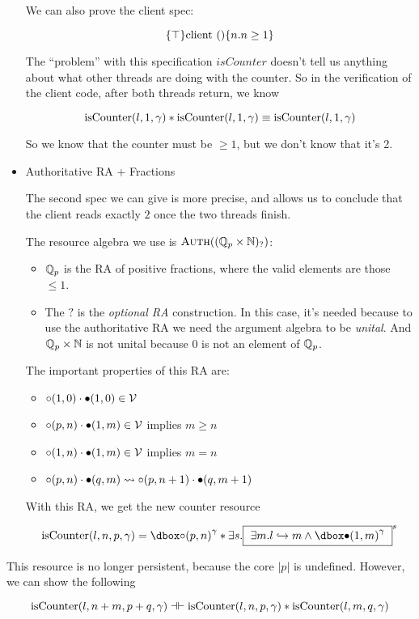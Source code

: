 \begin{itemize}
We can also prove the client spec:

\[ \{\top\} \text{client} \text{ } () \{n. n \ge 1\} \]

The ``problem'' with this specification $isCounter$ doesn't tell us anything about what other threads are doing with the counter. So in the verification of the client code, after both threads return, we know 

\[ \text{isCounter}(l, 1, \gamma)  * \text{isCounter}(l, 1, \gamma) \equiv \text{isCounter}(l, 1, \gamma) \]

So we know that the counter must be $\ge 1$, but we don't know that it's 2.

\item Authoritative RA + Fractions

The second spec we can give is more precise, and allows us to conclude that the client reads exactly $2$ once the two threads finish.

The resource algebra we use is $\textsc{Auth}((\mathbb{Q}_p \times \mathbb{N})_{?})$:
\begin{itemize}
\item $\mathbb{Q}_p$ is the RA of positive fractions, where the valid elements are those $\le 1$.
\item The $?$ is the \emph{optional RA} construction. In this case, it's needed because to use the authoritative RA we need the argument algebra to be \emph{unital}. And $\mathbb{Q}_p \times \mathbb{N}$ is not unital because $0$ is not an element of $\mathbb{Q}_p$.
\end{itemize}

The important properties of this RA are:
\begin{itemize}
\item $\circ (1, 0) \cdot \bullet (1, 0) \in \mathcal{V}$
\item $\circ (p, n) \cdot \bullet (1, m) \in \mathcal{V}$ implies $m \ge n$
\item $\circ (1, n) \cdot \bullet (1, m) \in \mathcal{V}$ implies $m = n$
\item $\circ (p, n) \cdot \bullet (q, m) \rightsquigarrow \circ (p, n + 1) \cdot \bullet (q, m + 1)$
\end{itemize}

With this RA, we get the new counter resource

\[ \isCounterF{l}{n}{p}{\gamma} = \ownr{\naelem{(p, n)}} {\gamma} * \exists s.\inv{ $\exists m. \pointsto{l}{m} \land \ownr{\aelem{(1, m)}}{\gamma} $ }{s} \]

\end{itemize}

This resource is no longer persistent, because the core $|p|$ is undefined. However, we can show the following

\[ \text{isCounter}(l, n + m, p + q, \gamma) \dashv \vdash  \text{isCounter}(l, n, p, \gamma) *  \text{isCounter}(l, m, q, \gamma)    \] 
